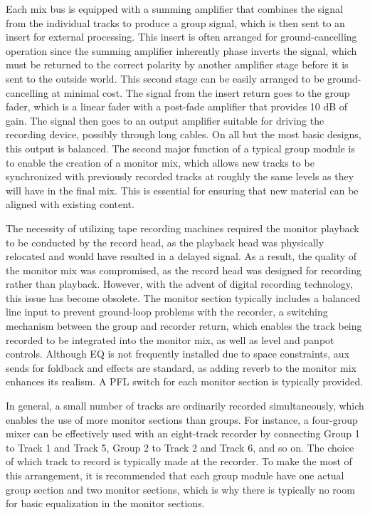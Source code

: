 Each mix bus is equipped with a summing amplifier that combines the signal from
the individual tracks to produce a group signal, which is then sent to an
insert for external processing. This insert is often arranged for
ground-cancelling operation since the summing amplifier inherently phase
inverts the signal, which must be returned to the correct polarity by another
amplifier stage before it is sent to the outside world. This second stage can
be easily arranged to be ground-cancelling at minimal cost. The signal from the
insert return goes to the group fader, which is a linear fader with a post-fade
amplifier that provides 10 dB of gain. The signal then goes to an output
amplifier suitable for driving the recording device, possibly through long
cables. On all but the most basic designs, this output is balanced. The second
major function of a typical group module is to enable the creation of a monitor
mix, which allows new tracks to be synchronized with previously recorded tracks
at roughly the same levels as they will have in the final mix. This is
essential for ensuring that new material can be aligned with existing content.

The necessity of utilizing tape recording machines required the monitor
playback to be conducted by the record head, as the playback head was
physically relocated and would have resulted in a delayed signal. As a result,
the quality of the monitor mix was compromised, as the record head was designed
for recording rather than playback. However, with the advent of digital
recording technology, this issue has become obsolete. The monitor section
typically includes a balanced line input to prevent ground-loop problems with
the recorder, a switching mechanism between the group and recorder return,
which enables the track being recorded to be integrated into the monitor mix,
as well as level and panpot controls. Although EQ is not frequently installed
due to space constraints, aux sends for foldback and effects are standard, as
adding reverb to the monitor mix enhances its realism. A PFL switch for each
monitor section is typically provided.

In general, a small number of tracks are ordinarily recorded simultaneously,
which enables the use of more monitor sections than groups. For instance, a
four-group mixer can be effectively used with an eight-track recorder by
connecting Group 1 to Track 1 and Track 5, Group 2 to Track 2 and Track 6, and
so on. The choice of which track to record is typically made at the recorder.
To make the most of this arrangement, it is recommended that each group module
have one actual group section and two monitor sections, which is why there is
typically no room for basic equalization in the monitor sections.

